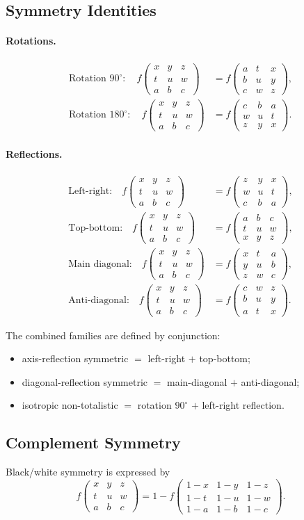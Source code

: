\documentclass[11pt,a4paper]{article}
\newcommand{\nbhd}[9]{%
  \begin{smallmatrix}
  #1 & #2 & #3 \\
  #4 & #5 & #6 \\
  #7 & #8 & #9
  \end{smallmatrix}
}
\newcommand{\F}[1]{f\!\left(#1\right)}
\begin{document}
\subsection{Symmetry Identities}

\paragraph{Rotations.}
\begin{align*}
\text{Rotation }90^\circ:\quad
\F{\nbhd{x}{y}{z}{t}{u}{w}{a}{b}{c}}
&=
\F{\nbhd{a}{t}{x}{b}{u}{y}{c}{w}{z}},\\
\text{Rotation }180^\circ:\quad
\F{\nbhd{x}{y}{z}{t}{u}{w}{a}{b}{c}}
&=
\F{\nbhd{c}{b}{a}{w}{u}{t}{z}{y}{x}}.
\end{align*}

\paragraph{Reflections.}
\begin{align*}
\text{Left-right:}\quad
\F{\nbhd{x}{y}{z}{t}{u}{w}{a}{b}{c}}
&=
\F{\nbhd{z}{y}{x}{w}{u}{t}{c}{b}{a}},\\
\text{Top-bottom:}\quad
\F{\nbhd{x}{y}{z}{t}{u}{w}{a}{b}{c}}
&=
\F{\nbhd{a}{b}{c}{t}{u}{w}{x}{y}{z}},\\
\text{Main diagonal:}\quad
\F{\nbhd{x}{y}{z}{t}{u}{w}{a}{b}{c}}
&=
\F{\nbhd{x}{t}{a}{y}{u}{b}{z}{w}{c}},\\
\text{Anti-diagonal:}\quad
\F{\nbhd{x}{y}{z}{t}{u}{w}{a}{b}{c}}
&=
\F{\nbhd{c}{w}{z}{b}{u}{y}{a}{t}{x}}.
\end{align*}

The combined families are defined by conjunction:
\begin{itemize}
\item axis-reflection symmetric \(=\) left-right \(+\) top-bottom;
\item diagonal-reflection symmetric \(=\) main-diagonal \(+\) anti-diagonal;
\item isotropic non-totalistic \(=\) rotation \(90^\circ\) \(+\) left-right reflection.
\end{itemize}

\subsection{Complement Symmetry}

Black/white symmetry is expressed by
\[
\F{\nbhd{x}{y}{z}{t}{u}{w}{a}{b}{c}}
=
1-\F{\nbhd{1-x}{1-y}{1-z}{1-t}{1-u}{1-w}{1-a}{1-b}{1-c}}.
\]
\end{document}
